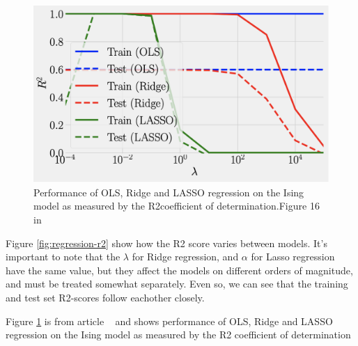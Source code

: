 \begin{figure}[H]
\includegraphics[width = 0.6\paperwidth]{figures/R2_article.png}
\caption{Performance of OLS, Ridge and LASSO regression on the Ising model as measured by the R2coefficient of determination.Figure 16 in ~\cite{HighBias}} 
\label{fig:regression-r2-article}
\end{figure}

Figure \ref{fig:regression-r2} show how the R2 score varies between models. 
It's important to note that the $\lambda$ for Ridge regression, and $\alpha$ 
for Lasso regression have the same value, but they affect the models on 
different orders of magnitude, and must be treated somewhat separately. 
Even so, we can see that the training and test set R2-scores
follow eachother closely.

Figure \ref{fig:regression-r2-article} is from article ~\cite{HighBias} and 
shows performance of OLS, Ridge and LASSO regression
on the Ising model as measured by the R2 coefficient of determination


